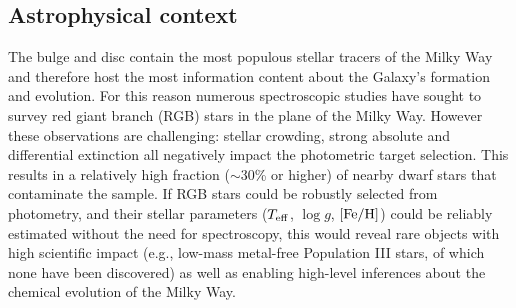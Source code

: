 \documentclass[a4paper]{article}
\begin{document}
\LST{}{}
%
%
\begin{ObservingProgram}
%
%
%
%
%
%
%
\subsection*{Astrophysical context}

The bulge and disc contain the most populous stellar tracers of the Milky Way and therefore host the most information content about the Galaxy's formation and evolution.  For this reason numerous spectroscopic studies have sought to survey red giant branch (RGB) stars in the plane of the Milky Way.  However these observations are challenging: stellar crowding, strong absolute and differential extinction all negatively impact the photometric target selection.  This results in a relatively high fraction ($\sim$30\% or higher) of nearby dwarf stars that contaminate the sample.  If RGB stars could be robustly selected from photometry, and their stellar parameters ($T_{\rm eff}$, $\log{g}$, ${\rm [Fe/H]}$) could be reliably estimated without the need for spectroscopy, this would reveal rare objects with high scientific impact (e.g., low-mass metal-free Population III stars, of which none have been discovered) as well as enabling high-level inferences about the chemical evolution of the Milky Way.



\end{ObservingProgram}
\end{document}
